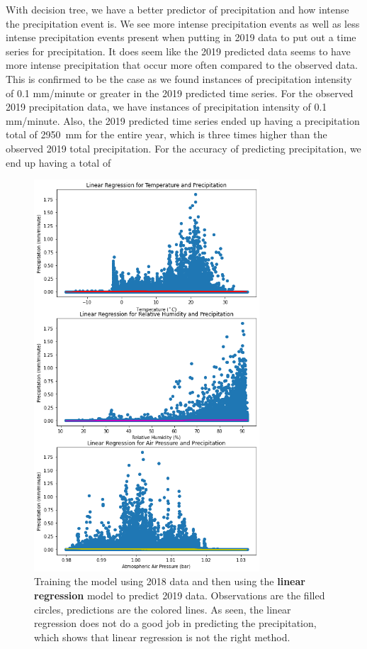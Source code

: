 \documentclass[11pt]{report}
\begin{document}
With decision tree, we have a better predictor of precipitation and how intense the precipitation event is. We see more intense precipitation events as well as less intense precipitation events present when putting in 2019 data to put out a time series for precipitation. It does seem like the 2019 predicted data seems to have more intense precipitation that occur more often compared to the observed data. This is confirmed to be the case as we found 
instances of precipitation intensity of 0.1 mm/minute or greater in the 2019 predicted time series. For the observed 2019 precipitation data, we have 
instances of precipitation intensity of 0.1 mm/minute. Also, the 2019 predicted time series ended up having a precipitation total of 2950~mm for the entire year, which is three times higher than the observed 2019 total precipitation. For the accuracy of predicting precipitation, we end up having a total of 
\begin{figure}[t]
  \centering
  \includegraphics[width=0.75\textwidth]{Figures/ML_Linear_reg.png}
  \caption[ML linear regression run] {\label{ML_Linear}Training the model
    using 2018 data and then using the \textbf{linear regression} model to
    predict 2019 data. Observations are the filled circles, predictions are
    the colored lines. As seen, the linear regression does not do a good job
    in predicting the precipitation, which shows that linear regression is
    not the right method. }
\end{figure}
\end{document}
